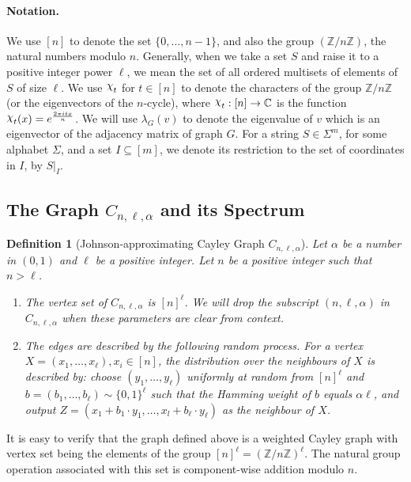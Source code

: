 \documentclass[11pt]{article}
\def \Z {\mathbb{Z}}
\def \Chi {\raisebox{2pt}{$\chi$}}
\newtheorem{definition}[theorem]{Definition}
\theoremstyle{definition}
\begin{document}
\paragraph{Notation.} 
We use $[n]$ to denote the set $\{0,\ldots,n-1\}$, and also the group $(\Z/n\Z)$, the natural numbers modulo $n$. 
Generally, when we take a set $S$ and raise it to a positive integer power $\ell$, we mean the set of all ordered multisets of elements of $S$ of size $\ell$. We use $\Chi_t$ for $t \in [n]$ to denote the characters of the group $\Z/n\Z$ (or the eigenvectors of the $n$-cycle), where $\Chi_t: [n] \rightarrow \mathbb{C}$ is the function $\Chi_t(x) = e^{\frac{2\pi i tx}{n}}$.
We will use $\lambda_G(v)$ to denote the eigenvalue of $v$ which is an eigenvector of the adjacency matrix of graph $G$. For a string $S \in \Sigma^m$, for some alphabet $\Sigma$, and a set $I \subseteq [m]$, we denote its restriction to the set of coordinates in $I$, by $S|_I$.


\subsection{The Graph $C_{n,\ell,\alpha}$ and its Spectrum}

\begin{definition}[Johnson-approximating Cayley Graph $C_{n,\ell,\alpha}$]
Let $\alpha$ be a number in $(0,1)$ and $\ell$ be a positive integer. Let $n$ be a positive integer such that $n > \ell$. 
\begin{enumerate}
\item The vertex set of $C_{n,\ell,\alpha}$ is $[n]^{\ell}$. We will drop the subscript $(n,\ell,\alpha)$ in $C_{n,\ell,\alpha}$ when these parameters are clear from context.
\item The edges are described by the following random process. For a vertex $X = (x_1,\ldots,x_\ell), x_i \in [n]$, the distribution over the neighbours of $X$ is described by: choose $(y_1,\ldots,y_\ell)$ uniformly at random from $[n]^{\ell}$ and $b = (b_1,\ldots,b_{\ell}) \sim \{0,1\}^{\ell}$ such that the Hamming weight of $b$ equals $\alpha \ell$, and output $Z = (x_1 + b_1 \cdot y_1,\ldots,x_l + b_\ell \cdot y_\ell)$ as the neighbour of $X$.
\end{enumerate}
\end{definition}


It is easy to verify that the graph defined above is a weighted Cayley graph with vertex set being the elements of the group $[n]^\ell = (\Z/n\Z)^{\ell}$. The natural group operation associated with this set is component-wise addition modulo $n$. 
\end{document}
